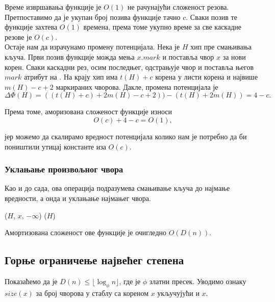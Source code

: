 \documentclass[11pt, a4paper]{article}
\theoremstyle{remark}
\numberwithin{equation}{section}
\begin{document}
	\noindent Време извршавања функције  је $O(1)$ не рачунајући сложеност резова. Претпоставимо да је укупан број позива функције  тачно $c$. Сваки позив те функције захтева $O(1)$ времена, према томе укупно време за све каскадне резове је $O(c)$. \\
	\indent Остаје нам да израчунамо промену потенцијала. Нека је $H$ хип пре смањивања кључа. Први позив функције  можда мења $x.mark$ и поставља чвор $x$ за нови корен. Сваки каскадни рез, осим последњег, одстрањује чвор и поставља његов $mark$ атрибут на . На крају хип има $t(H)+c$ корена у листи корена и највише $m(H)-c+2$ маркираних чворова. Дакле, промена потенцијала је
	\begin{equation}
		\Delta \Phi(H)=((t(H)+c)+2m(H)-c+2))-(t(H)+2m(H))=4-c.
	\end{equation}
	
	Према томе, аморизована сложеност функције  износи
	\begin{equation}
		O(c)+4-c=O(1),
	\end{equation}
	
	\noindent јер можемо да скалирамо вредност потенцијала колико нам је потребно да би поништили утицај константе иза $O(c)$.
	
	\subsubsection{Уклањање произвољног чвора}
	
	Као и до сада, ова операција подразумева смањивање кључа до најмање вредности, а онда и уклањање најмањег чвора.
	
	\begin{codebox}
		\li {}($H$, $x$, $-\infty$)
		\li {}($H$)
	\end{codebox}

	\noindent Амортизована сложеност ове функције је очигледно $O(D(n))$.
	
	\subsection{Горње ограничење највећег степена}
	
	Показаћемо да је $D(n) \leq \lfloor \log_\phi n \rfloor$, где је $\phi$ златни пресек. Уводимо ознаку $size(x)$ за број чворова у стаблу са кореном $x$ укључујући и $x$. \\
	
\end{document}
